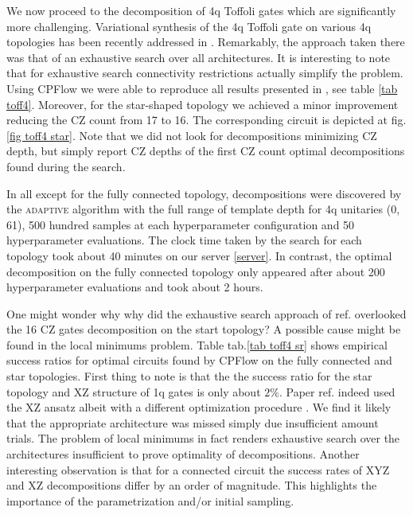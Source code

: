 \documentclass[amsfonts, amssymb, aps, nofootinbib, twocolumn]{revtex4-2}
\newcommand{\CZ}{CZ }
\newcommand{\package}[1]{\textrm {#1 }}
\newcommand{\cpflow}{\package{CPFlow}}
\newcommand{\adaptive}{\textsc{adaptive }}
\begin{document}
We now proceed to the decomposition of 4q Toffoli gates which are significantly more challenging. Variational synthesis of the 4q Toffoli gate on various 4q topologies has been recently addressed in \cite{Nakanishi2021}. Remarkably, the approach taken there was that of an exhaustive search over all architectures. It is interesting to note that for exhaustive search connectivity restrictions actually simplify the problem. Using \cpflow we were able to reproduce all results presented in \cite{Nakanishi2021}, see table \ref{tab toff4}. Moreover, for the star-shaped topology we achieved a minor improvement reducing the \CZ count from 17 to 16. The corresponding circuit is depicted at fig.\ref{fig toff4 star}. Note that we did not look for decompositions minimizing \CZ depth, but simply report \CZ depths of the first \CZ count optimal decompositions found during the search.

In all except for the fully connected topology, decompositions were discovered by the \adaptive algorithm with the full range of template depth for 4q unitaries (0, 61), 500 hundred samples at each hyperparameter configuration and 50 hyperparameter evaluations. The clock time taken by the search for each topology took about 40 minutes on our server \ref{server}. In contrast, the optimal decomposition on the fully connected topology only appeared after about 200 hyperparameter evaluations and took about 2 hours.

One might wonder why why did the exhaustive search approach of ref.\cite{Nakanishi2021} overlooked the 16 \CZ gates decomposition on the start topology? A possible cause might be found in the local minimums problem. Table tab.\ref{tab toff4 sr} shows empirical success ratios for optimal circuits found by \cpflow on the fully connected and star topologies. First thing to note is that the the success ratio for the star topology and XZ structure of 1q gates is only about $2\%$. Paper ref.\cite{Nakanishi2021} indeed used the XZ ansatz albeit with a different optimization procedure \cite{Nakanishi2020}. We find it likely that the appropriate architecture was missed simply due insufficient amount trials. The problem of local minimums in fact renders exhaustive search over the architectures insufficient to prove optimality of decompositions. Another interesting observation is that for a connected circuit the success rates of XYZ and XZ decompositions differ by an order of magnitude. This highlights the importance of the parametrization and/or initial sampling. 
\end{document}
